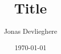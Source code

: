 \documentclass[11pt,a4paper,oneside]{article}
\title{Title}
\date{\today}
\author{Jonas Devlieghere}
\begin{document}
\maketitle
\newpage

\tableofcontents
\newpage


\appendix 



\nocite{*}
\end{document}
